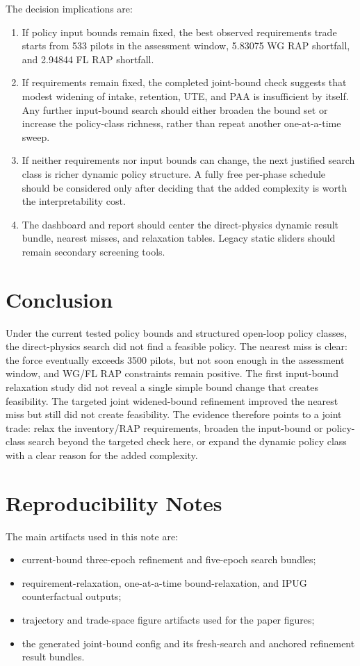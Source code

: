 \documentclass[10pt]{article}
\begin{document}
The decision implications are:
\begin{enumerate}
  \item If policy input bounds remain fixed, the best observed requirements
  trade starts from 533 pilots in the assessment window, 5.83075 WG RAP
  shortfall, and 2.94844 FL RAP shortfall.
  \item If requirements remain fixed, the completed joint-bound check suggests
  that modest widening of intake, retention, UTE, and PAA is insufficient by
  itself. Any further input-bound search should either broaden the bound set or
  increase the policy-class richness, rather than repeat another one-at-a-time
  sweep.
  \item If neither requirements nor input bounds can change, the next justified
  search class is richer dynamic policy structure. A fully free per-phase
  schedule should be considered only after deciding that the added complexity
  is worth the interpretability cost.
  \item The dashboard and report should center the direct-physics dynamic
  result bundle, nearest misses, and relaxation tables. Legacy static sliders
  should remain secondary screening tools.
\end{enumerate}

\section{Conclusion}

Under the current tested policy bounds and structured open-loop policy classes,
the direct-physics search did not find a feasible policy. The nearest miss is
clear: the force eventually exceeds 3500 pilots, but not soon enough in the
assessment window, and WG/FL RAP constraints remain positive. The first
input-bound relaxation study did not reveal a single simple bound change that
creates feasibility. The targeted joint widened-bound refinement improved the
nearest miss but still did not create feasibility. The evidence therefore
points to a joint trade: relax the inventory/RAP requirements, broaden the
input-bound or policy-class search beyond the targeted check here, or expand
the dynamic policy class with a clear reason for the added complexity.

\appendix
\section{Reproducibility Notes}

The main artifacts used in this note are:
\begin{itemize}
  \item current-bound three-epoch refinement and five-epoch search bundles;
  \item requirement-relaxation, one-at-a-time bound-relaxation, and IPUG
  counterfactual outputs;
  \item trajectory and trade-space figure artifacts used for the paper figures;
  \item the generated joint-bound config and its fresh-search and anchored
  refinement result bundles.
\end{itemize}
\end{document}
